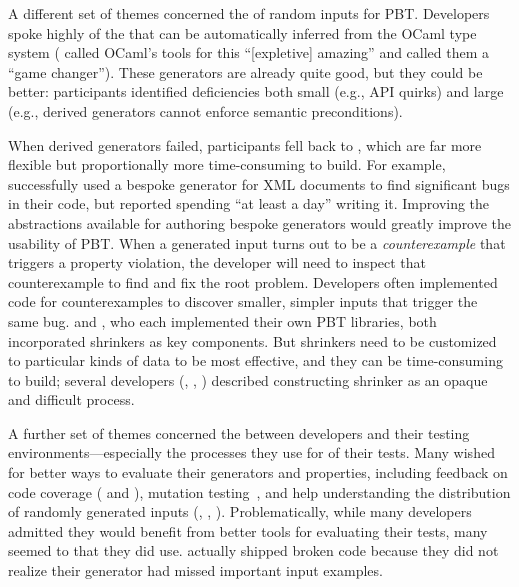 A different set of themes concerned the  of
random inputs for PBT. Developers spoke
highly of the  that can be automatically
inferred from
the OCaml type system ( called OCaml's tools for this
``[expletive] amazing'' and  called them a ``game changer'').
These generators are already quite good, but they could be better: participants
identified deficiencies both small (e.g., API quirks) and large (e.g.,
derived generators
cannot enforce semantic preconditions).

When derived generators
failed, participants fell back to , which
are far more flexible but proportionally more time-consuming to
build. For example,  successfully used a bespoke
generator for XML documents to find significant bugs in their code,
but reported spending ``at least a day'' writing it.
Improving the abstractions available for authoring bespoke generators would
greatly improve the usability of PBT.
%
When a generated input turns out to be a {\em counterexample} that triggers
a property violation, the developer will need to inspect that
counterexample to find
and fix the root problem. Developers often implemented code for
 counterexamples to discover smaller,
simpler inputs that trigger the same bug.  
and , who each implemented their own PBT libraries, both
incorporated shrinkers as key components. But
shrinkers need to be customized to particular kinds of data to be most
effective, and they can be time-consuming to build; several
developers
(,  , )
described constructing shrinker as an opaque and difficult process.

A further set of themes concerned the
 between developers and their
testing environments---especially the processes they use
for  of their tests. Many
wished for
better ways to evaluate their generators and properties, including
feedback on code coverage ( and ),
mutation
testing~\cite{papadakis_mutation_2018}, and help understanding the
distribution of randomly generated
inputs (, , ). Problematically,
while many developers admitted they would benefit from better tools for
evaluating their tests, many seemed to
 that they did use.  actually shipped broken code because
they did not realize their generator had missed important input
examples.
\iflater
{}
\fi


